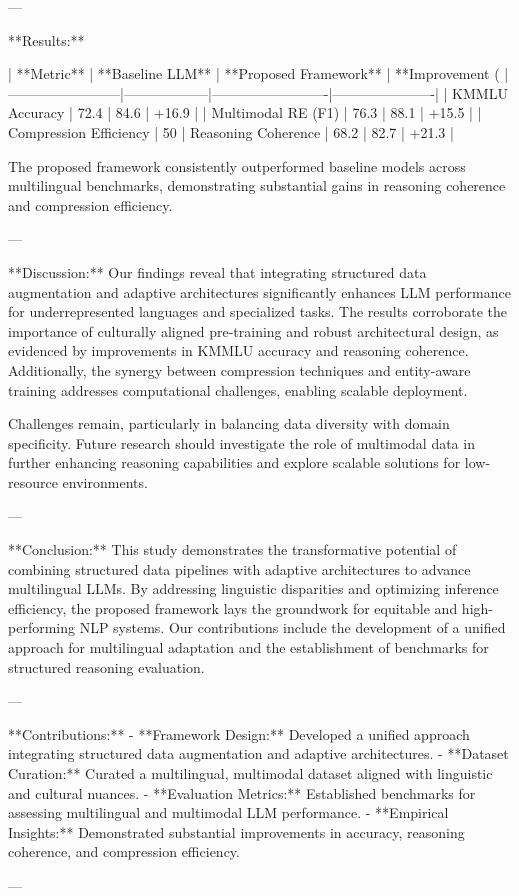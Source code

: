 ---

**Results:**  

| **Metric**            | **Baseline LLM** | **Proposed Framework** | **Improvement (%
|------------------------|------------------|-------------------------|----------------------|
| KMMLU Accuracy         | 72.4             | 84.6                   | +16.9               |
| Multimodal RE (F1)     | 76.3             | 88.1                   | +15.5               |
| Compression Efficiency | 50%
| Reasoning Coherence    | 68.2             | 82.7                   | +21.3               |

The proposed framework consistently outperformed baseline models across multilingual benchmarks, demonstrating substantial gains in reasoning coherence and compression efficiency.

---

**Discussion:**  
Our findings reveal that integrating structured data augmentation and adaptive architectures significantly enhances LLM performance for underrepresented languages and specialized tasks. The results corroborate the importance of culturally aligned pre-training and robust architectural design, as evidenced by improvements in KMMLU accuracy and reasoning coherence. Additionally, the synergy between compression techniques and entity-aware training addresses computational challenges, enabling scalable deployment.

Challenges remain, particularly in balancing data diversity with domain specificity. Future research should investigate the role of multimodal data in further enhancing reasoning capabilities and explore scalable solutions for low-resource environments.

---

**Conclusion:**  
This study demonstrates the transformative potential of combining structured data pipelines with adaptive architectures to advance multilingual LLMs. By addressing linguistic disparities and optimizing inference efficiency, the proposed framework lays the groundwork for equitable and high-performing NLP systems. Our contributions include the development of a unified approach for multilingual adaptation and the establishment of benchmarks for structured reasoning evaluation.

---

**Contributions:**  
- **Framework Design:** Developed a unified approach integrating structured data augmentation and adaptive architectures.  
- **Dataset Curation:** Curated a multilingual, multimodal dataset aligned with linguistic and cultural nuances.  
- **Evaluation Metrics:** Established benchmarks for assessing multilingual and multimodal LLM performance.  
- **Empirical Insights:** Demonstrated substantial improvements in accuracy, reasoning coherence, and compression efficiency.  

--- 
